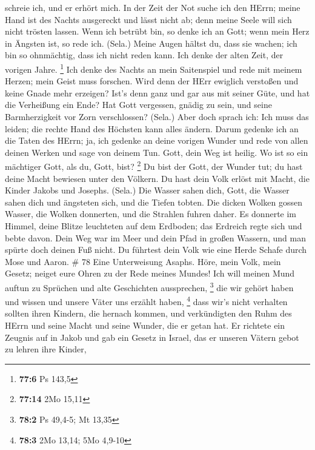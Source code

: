 schreie ich, und er erhört mich.  In der Zeit der Not suche
ich den HErrn; meine Hand ist des Nachts ausgereckt und lässt nicht ab;
denn meine Seele will sich nicht trösten lassen.  Wenn ich
betrübt bin, so denke ich an Gott; wenn mein Herz in Ängsten ist, so
rede ich. (Sela.)  Meine Augen hältst du, dass sie wachen;
ich bin so ohnmächtig, dass ich nicht reden kann.  Ich denke
der alten Zeit, der vorigen Jahre. \footnote{\textbf{77:6} Ps 143,5}
 Ich denke des Nachts an mein Saitenspiel und rede mit
meinem Herzen; mein Geist muss forschen.  Wird denn der HErr
ewiglich verstoßen und keine Gnade mehr erzeigen?  Ist's
denn ganz und gar aus mit seiner Güte, und hat die Verheißung ein Ende?
 Hat Gott vergessen, gnädig zu sein, und seine
Barmherzigkeit vor Zorn verschlossen? (Sela.)  Aber doch
sprach ich: Ich muss das leiden; die rechte Hand des Höchsten kann alles
ändern.  Darum gedenke ich an die Taten des HErrn; ja, ich
gedenke an deine vorigen Wunder  und rede von allen deinen
Werken und sage von deinem Tun.  Gott, dein Weg ist heilig.
Wo ist so ein mächtiger Gott, als du, Gott, bist? \footnote{\textbf{77:14}
  2Mo 15,11}  Du bist der Gott, der Wunder tut; du hast
deine Macht bewiesen unter den Völkern.  Du hast dein Volk
erlöst mit Macht, die Kinder Jakobs und Josephs. (Sela.) 
Die Wasser sahen dich, Gott, die Wasser sahen dich und ängsteten sich,
und die Tiefen tobten.  Die dicken Wolken gossen Wasser,
die Wolken donnerten, und die Strahlen fuhren daher.  Es
donnerte im Himmel, deine Blitze leuchteten auf dem Erdboden; das
Erdreich regte sich und bebte davon.  Dein Weg war im Meer
und dein Pfad in großen Wassern, und man spürte doch deinen Fuß nicht.
 Du führtest dein Volk wie eine Herde Schafe durch Mose und
Aaron. \# 78  Eine Unterweisung Asaphs. Höre, mein Volk,
mein Gesetz; neiget eure Ohren zu der Rede meines Mundes! 
Ich will meinen Mund auftun zu Sprüchen und alte Geschichten
aussprechen, \footnote{\textbf{78:2} Ps 49,4-5; Mt 13,35} 
die wir gehört haben und wissen und unsere Väter uns erzählt haben,
\footnote{\textbf{78:3} 2Mo 13,14; 5Mo 4,9-10}  dass wir's
nicht verhalten sollten ihren Kindern, die hernach kommen, und
verkündigten den Ruhm des HErrn und seine Macht und seine Wunder, die er
getan hat.  Er richtete ein Zeugnis auf in Jakob und gab ein
Gesetz in Israel, das er unseren Vätern gebot zu lehren ihre Kinder,
